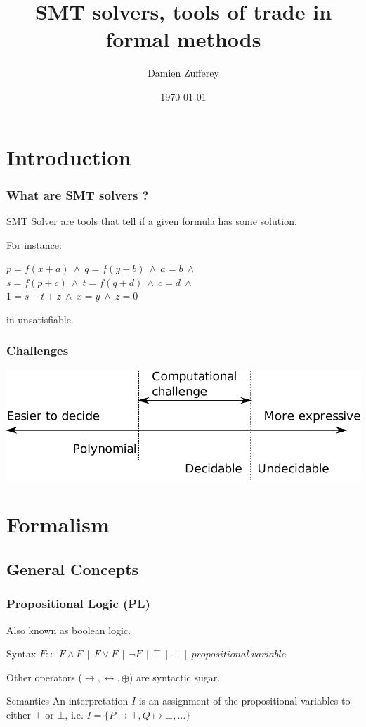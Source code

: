 \documentclass{beamer}
\title[SMT solvers]{SMT solvers, tools of trade in formal methods}
\author{ Damien Zufferey }
\institute{ IST Austria }
\date{\today}
\begin{document}
\frame[plain]{\titlepage}

\begin{frame}
\tableofcontents
\end{frame}

\section{Introduction}
\begin{frame}
  \frametitle{What are SMT solvers ?}
  SMT Solver are tools that tell if a given formula has some solution.

  \vspace{20pt}

  For instance:
  \begin{center}
    $p = f(x + a) ~\land~ q = f( y + b ) ~\land~ a = b ~\land$\\
    $s = f(p + c)  ~\land~ t = f(q + d)  ~\land~ c = d ~\land$\\
    $1 = s -t + z ~\land~ x = y ~\land~ z = 0$
  \end{center}
  in unsatisfiable.

  
\end{frame}

\begin{frame}
  \frametitle{Challenges}
  \includegraphics[scale=0.72]{challenge}
\end{frame}

\section{Formalism}
\subsection{General Concepts}
\begin{frame}
  \frametitle{Propositional Logic (PL)}
  Also known as boolean logic.
  \begin{block}{Syntax}
  $F :: ~~ F \wedge F ~~|~~ F \vee F ~~|~~ \neg F ~~|~~ \top ~~|~~ \bot ~~|~~ \mathit{propositional\ variable} $
  \end{block}
  Other operators ($\rightarrow, \leftrightarrow, \oplus$) are syntactic sugar.

  \begin{block}{Semantics}
  An interpretation $I$ is an assignment of the propositional variables to either $\top$ or $\bot$,
  i.e. $I = \{P \mapsto \top, Q \mapsto \bot, \ldots \}$
  \end{block}
\end{frame}
\end{document}
